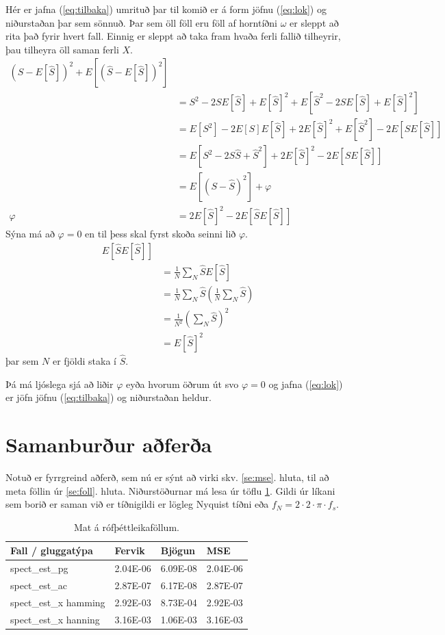 \documentclass[11pt,a4paper]{article}
\begin{document}
Hér er jafna (\ref{eq:tilbaka}) umrituð þar til komið er á form
jöfnu (\ref{eq:lok}) og niðurstaðan þar sem sönnuð. Þar sem öll föll eru 
föll af horntíðni $\omega$ er sleppt að rita það fyrir hvert fall.
Einnig er sleppt að taka fram hvaða ferli fallið tilheyrir, þau 
tilheyra öll saman ferli $X$.
\begin{align*}
    (S-E[\hat{S}])^2 + E[(\hat{S}-E[\hat{S}])^2] \\
    &= S^2 - 2SE[\hat{S}]+E[\hat{S}]^2
    + E[\hat{S}^2-2\hat{S}E[\hat{S}]+E[\hat{S}]^{2}] \\
    &= E[S^2]-2E[S]E[\hat{S}] +2E[\hat{S}]^2 
    +E[\hat{S}^2]-2E[\hat{S}E[\hat{S}]] \\
    &= E[S^2-2S\hat{S}+\hat{S}^2]+2E[\hat{S}]^2-2E[\hat{S}E[\hat{S}]] \\
    &= E[(S-\hat{S})^2] + \varphi \\
    \varphi &= 2E[\hat{S}]^2-2E[\hat{S}E[\hat{S}]]
\end{align*}
Sýna má að $\varphi=0$ en til þess skal fyrst skoða seinni lið $\varphi$.
\begin{align*}
    E[\hat{S}E[\hat{S}]] \\
    &= \frac{1}{N}\sum_N \hat{S} E[\hat{S}] \\
    &= \frac{1}{N}\sum_N \hat{S} 
    \left(\frac{1}{N} \sum_N \hat{S}\right) \\
    &= \frac{1}{N^2}\left(\sum_N \hat{S} \right) ^{2} \\
    &= E[\hat{S}]^2
\end{align*}
þar sem $N$ er fjöldi staka í $\hat{S}$.

Þá má ljóslega sjá að liðir $\varphi$ eyða hvorum öðrum út svo 
$\varphi=0$ og jafna (\ref{eq:lok}) er jöfn jöfnu (\ref{eq:tilbaka})
og niðurstaðan heldur.
\section{Samanburður aðferða}
Notuð er fyrrgreind aðferð, sem nú er sýnt að virki skv. \ref{se:mse}.
hluta, til að meta föllin úr \ref{se:foll}. hluta. Niðurstöðurnar
má lesa úr töflu \ref{tab:tafla}. Gildi úr líkani sem borið er saman
við er tíðnigildi er lögleg Nyquist tíðni eða 
$f_N = 2\cdot2\cdot\pi\cdot f_s$.
\begin{table}[htbp]
    \centering
    \begin{tabular}{l | l | l | l}
        Fall / gluggatýpa & Fervik & Bjögun & MSE \\ \hline
        spect\_est\_pg    & 2.04E-06 & 6.09E-08 & 2.04E-06 \\
        spect\_est\_ac    & 2.87E-07 & 6.17E-08 & 2.87E-07 \\
        spect\_est\_x hamming & 2.92E-03 & 8.73E-04 & 2.92E-03 \\
        spect\_est\_x hanning & 3.16E-03 & 1.06E-03 & 3.16E-03 \\
    \end{tabular}
    \caption{Mat á rófþéttleikaföllum.}
    \label{tab:tafla}
\end{table}
\end{document}
